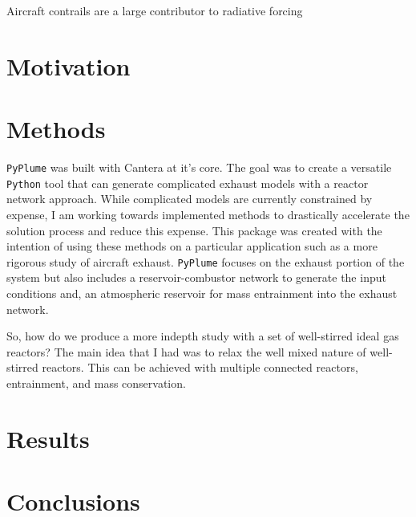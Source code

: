 \documentclass[smallextended,referee]{svjour3}
\begin{document}
Aircraft contrails are a large contributor to radiative forcing

\section{Motivation}


\section{Methods}

\texttt{PyPlume} was built with Cantera\cite{cantera} at it's core. The goal was to create a versatile \texttt{Python} tool that can generate complicated exhaust models with a reactor network approach. While complicated models are currently constrained by expense, I am working towards implemented methods to drastically accelerate the solution process and reduce this expense. This package was created with the intention of using these methods on a particular application such as a more rigorous study of aircraft exhaust. \texttt{PyPlume} focuses on the exhaust portion of the system but also includes a reservoir-combustor network to generate the input conditions and, an atmospheric reservoir for mass entrainment into the exhaust network.



So, how do we produce a more indepth study with a set of well-stirred ideal gas reactors? The main idea that I had was to relax the well mixed nature of well-stirred reactors. This can be achieved with multiple connected reactors, entrainment, and mass conservation. 

\section{Results}

\section{Conclusions}

\begin{acknowledgements}

\end{acknowledgements}

\appendix




\end{document}
